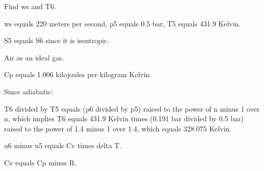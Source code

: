 Find ws and T6.

ws equals 220 meters per second, p5 equals 0.5 bar, T5 equals 431.9 Kelvin.

S5 equals S6 since it is isentropic.

Air as an ideal gas.

Cp equals 1.006 kilojoules per kilogram Kelvin.

Since adiabatic:

T6 divided by T5 equals (p6 divided by p5) raised to the power of n minus 1 over n, which implies T6 equals 431.9 Kelvin times (0.191 bar divided by 0.5 bar) raised to the power of 1.4 minus 1 over 1.4, which equals 328.075 Kelvin.

u6 minus u5 equals Cv times delta T.

Cv equals Cp minus R.
